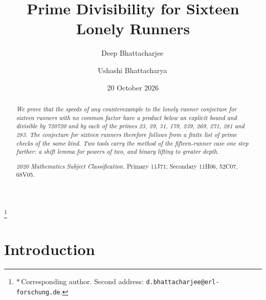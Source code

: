 \documentclass[aps,prd,twocolumn,superscriptaddress,nofootinbib,longbibliography,floatfix,showkeys,amsmath,amssymb,10pt]{revtex4-2}
\theoremstyle{definition}
\theoremstyle{remark}
\begin{document}
\title{Prime Divisibility for Sixteen Lonely Runners}

\author{Deep Bhattacharjee\,}
\thanks{$*$\,Corresponding author. Second address:
\nolinkurl{d.bhattacharjee@erl-forschung.de}.}

\author{Ushashi Bhattacharya\,}

\date{20 October 2026}

\begin{abstract}
\itshape
We prove that the speeds of any counterexample to the lonely runner conjecture for sixteen runners with no common factor have a product below an explicit bound and divisible by 720720 and by each of the primes 23, 29, 31, 179, 239, 269, 271, 281 and 283. The conjecture for sixteen runners therefore follows from a finite list of prime checks of the same kind. Two tools carry the method of the fifteen-runner case one step further: a shift lemma for powers of two, and binary lifting to greater depth.
\par\medskip\upshape\noindent
\textit{2020 Mathematics Subject Classification.} Primary 11J71;
Secondary 11H06, 52C07, 68V05.
\end{abstract}


\maketitle

\makeatletter
\renewcommand\l@subsection[2]{}
\renewcommand\l@subsubsection[2]{}
\makeatother
\tableofcontents

\section{Introduction}\label{sec:intro}
\end{document}
